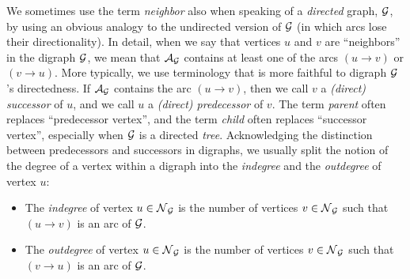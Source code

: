 We sometimes use the term {\it neighbor} also when speaking of a {\em directed} graph,
$\mbox{$\cal G$}$, by using an obvious analogy to the undirected version of $\mbox{$\cal G$}$ (in which arcs lose
their directionality).  In detail, when we say that vertices $u$ and $v$ are ``neighbors'' in the
digraph $\mbox{$\cal G$}$, we mean that $\mbox{$\cal A$}_{\mbox{{\scriptsize $\cal G$}}}$ contains at least one of the arcs $(u \rightarrow v)$ 
or $(v \rightarrow u)$.  More typically, we use terminology that is more faithful to digraph $\mbox{$\cal G$}$'s 
directedness.  If $\mbox{$\cal A$}_{\mbox{{\scriptsize $\cal G$}}}$ contains the arc $(u \rightarrow v)$, then we call $v$ a
{\it (direct) successor} of $u$, and we call $u$ a {\it (direct) predecessor} of $v$.
The term {\it parent} often replaces ``predecessor vertex'', and the
term {\it child} often replaces ``successor vertex'', especially when
$\mbox{$\cal G$}$ is a directed {\em tree}.  Acknowledging the distinction between
predecessors and successors in digraphs, we usually split the notion
of the degree of a vertex within a digraph into the {\it indegree} and
the {\it outdegree} of vertex $u$:
\begin{itemize}
\item
The {\it indegree} of vertex $u \in \mbox{$\cal N$}_{\mbox{{\scriptsize $\cal G$}}}$ is the number of vertices $v \in \mbox{$\cal N$}_{\mbox{{\scriptsize $\cal G$}}}$ such
that $(u \rightarrow v)$ is an arc of $\mbox{$\cal G$}$.
\item
The {\it outdegree} of vertex $u \in \mbox{$\cal N$}_{\mbox{{\scriptsize $\cal G$}}}$ is the number of vertices $v \in \mbox{$\cal N$}_{\mbox{{\scriptsize $\cal G$}}}$ such
that $(v \rightarrow u)$ is an arc of $\mbox{$\cal G$}$.
\end{itemize}

\smallskip

